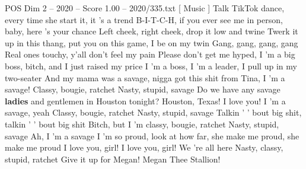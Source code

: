 \begin{textsample}{POS Dim 2 – 2020 – Score 1.00 – 2020/335.txt}  \label{ex:f2_pos_028}
[ Music ] Talk TikTok dance, every time she start it, it 's a trend B-I-T-C-H, if you ever see me in person, baby, here 's your chance Left cheek, right cheek, drop it low and twine Twerk it up in this thang, put you on this game, I be on my twin Gang, gang, gang, gang Real ones touchy, y'all don't feel my pain Please don't get me hyped, I 'm a big boss, bitch, and I just raised my price I 'm a boss, I 'm a leader, I pull up in my two-seater And my mama was a savage, nigga got this shit from Tina, I 'm a savage!
Classy, bougie, ratchet Nasty, stupid, savage Do we have any savage \textbf{ladies} and gentlemen in Houston tonight?
Houston, Texas!
I love you!
I 'm a savage, yeah Classy, bougie, ratchet Nasty, stupid, savage Talkin ' ' bout big shit, talkin ' ' bout big shit Bitch, but I 'm classy, bougie, ratchet Nasty, stupid, savage Ah, I 'm a savage I 'm so proud, look at how far, she make me proud, she make me proud I love you, girl!
I love you, girl!
We 're all here Nasty, classy, stupid, ratchet Give it up for Megan!
Megan Thee Stallion!

\end{textsample}
